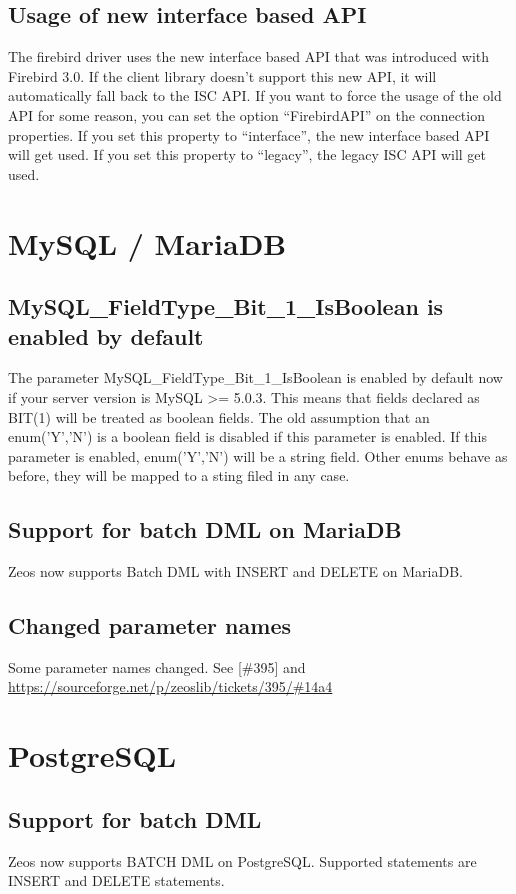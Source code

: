 \documentclass[a4paper,12pt,oneside]{article}
\begin{document}
\subsection{Usage of new interface based API}
The firebird driver uses the new interface based API that was introduced with Firebird 3.0.
If the client library doesn't support this new API, it will automatically fall back to the ISC API.
If you want to force the usage of the old API for some reason, you can set the option "`FirebirdAPI"' on the connection properties.
If you set this property to "`interface"', the new interface based API will get used.
If you set this property to "`legacy"', the legacy ISC API will get used.

\section{MySQL / MariaDB}

\subsection{MySQL\_FieldType\_Bit\_1\_IsBoolean is enabled by default}

The parameter MySQL\_FieldType\_Bit\_1\_IsBoolean is enabled by default now if your server version is MySQL >= 5.0.3.
This means that fields declared as BIT(1) will be treated as boolean fields.
The old assumption that an enum('Y','N') is a boolean field is disabled if this parameter is enabled.
If this parameter is enabled, enum('Y','N') will be a string field.
Other enums behave as before, they will be mapped to a sting filed in any case.

\subsection{Support for batch DML on MariaDB}
Zeos now supports Batch DML with INSERT and DELETE on MariaDB.

\subsection{Changed parameter names}
Some parameter names changed.
See [\#395] and \url{https://sourceforge.net/p/zeoslib/tickets/395/#14a4}

\section{PostgreSQL}

\subsection{Support for batch DML}
Zeos now supports BATCH DML on PostgreSQL. 
Supported statements are INSERT and DELETE statements.
\end{document}
